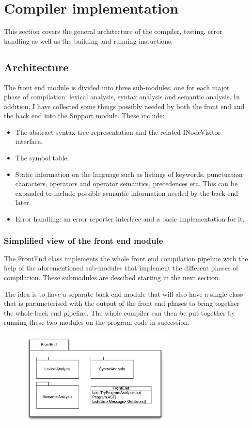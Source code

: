 \documentclass[a4paper,11pt]{article}
\begin{document}
\section{Compiler implementation}

This section covers the general architecture of the compiler, testing, error handling as well as the building and running instuctions.

\subsection{Architecture}

The front end module is divided into three sub-modules, one for each major phase of compilation: lexical analysis, syntax analysis and semantic analysis. In addition, I have collected some things possibly needed by both the front end and the back end into the Support module. These include:
\begin{itemize}
\item The abstract syntax tree representation and the related INodeVisitor interface.
\item The symbol table.
\item Static information on the language such as listings of keywords, punctuation characters, operators and operator semantics, precedences etc. This can be expanded to include possible semantic information needed by the back end later.
\item Error handling: an error reporter interface and a basic implementation for it.
\end{itemize}

\subsubsection{Simplified view of the front end module}

The FrontEnd class implements the whole front end compilation pipeline with the help of the aforementioned sub-modules that implement the different phases of compilation. These submodules are descibed starting in the next section.

The idea is to have a separate back end module that will also have a single class that is parameterised with the output of the front end phases to bring together the whole back end pipeline. The whole compiler can then be put together by running these two modules on the program code in succession.

\begin{figure}[h!]
\centering
\includegraphics[width=0.7\textwidth]{frontend.pdf}
\end{figure}
\end{document}
